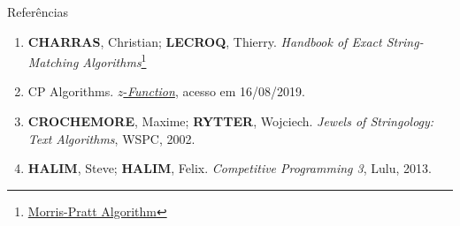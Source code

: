 \begin{frame}[fragile]{Referências}

    \begin{enumerate}
        \item \textbf{CHARRAS}, Christian; \textbf{LECROQ}, Thierry. \textit{Handbook of Exact String-Matching Algorithms}\footnote{\href{http://www-igm.univ-mlv.fr/~lecroq/string/node7.html}{Morris-Pratt Algorithm}}

        \item CP Algorithms. \href{https://cp-algorithms.com/string/z-function.html}{$z$-{\it Function}}, acesso em 16/08/2019.

        \item \textbf{CROCHEMORE}, Maxime; \textbf{RYTTER}, Wojciech. \textit{Jewels of Stringology: Text Algorithms}, WSPC, 2002.

        \item \textbf{HALIM}, Steve; \textbf{HALIM}, Felix. \textit{Competitive Programming 3}, Lulu, 2013.
    \end{enumerate}

\end{frame}
